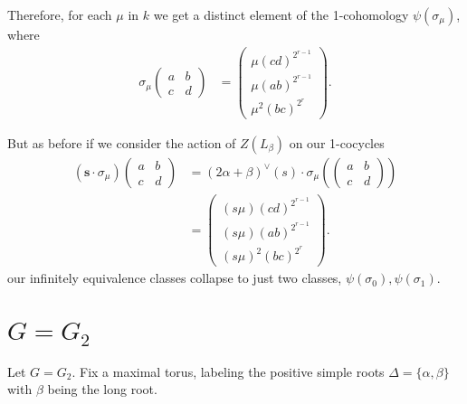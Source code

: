 Therefore, for each $\mu$ in $k$ we get a distinct element of the 1-cohomology $\psi(\sigma_\mu)$, where
\begin{align*}
\sigma_\mu\left(\begin{matrix} a & b \\ c & d \end{matrix}\right) &=
\left(\begin{matrix}  \mu(cd)^{2^{r-1}}  \\ \mu\left(ab \right)^{2^{r-1}} \\ \mu^2\left( bc \right)^{2^r} \end{matrix}\right).
\end{align*}

But as before if we consider the action of $Z(L_\beta)$ on our 1-cocycles
\begin{align*}
(\mathbf{s}\cdot \sigma_\mu)\left(\begin{matrix} a & b \\ c & d \end{matrix}\right) &=
(2\alpha + \beta)^\vee(s) \cdot \sigma_\mu\left(\left(\begin{matrix} a & b \\ c & d \end{matrix}\right)\right)\\
&=
\left(\begin{matrix}  (s\mu)(cd)^{2^{r-1}}  \\ (s\mu)\left(ab \right)^{2^{r-1}} \\ (s\mu)^2\left( bc \right)^{2^r} \end{matrix}\right).
\end{align*}
our infinitely equivalence classes collapse to just two classes, $\psi(\sigma_0), \psi(\sigma_1)$.

	\section{$G = G_2$}
	\label{g2}

	Let $G=G_2$. Fix a maximal torus, labeling the positive simple roots $\Delta=\{\alpha, \beta\}$ with $\beta$ being the long root. 

